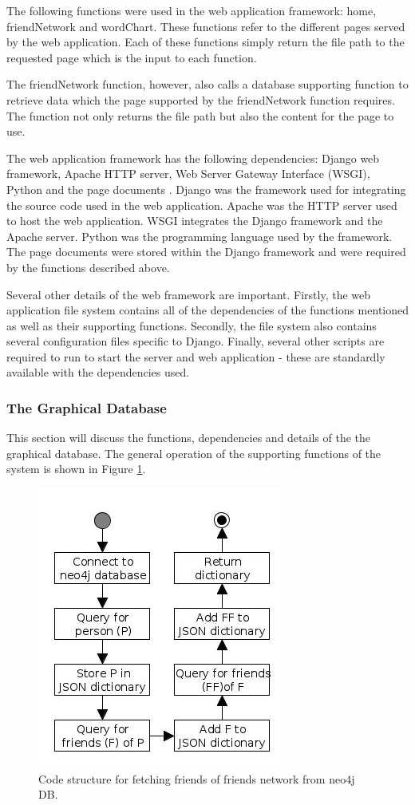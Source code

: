 \documentclass[10pt,onecolumn]{article}
\begin{document}
	The following functions were used in the web application framework: home, friendNetwork and wordChart. These functions refer to the different pages served by the web application. Each of these functions simply return the file path to the requested page which is the input to each function.
	
	The friendNetwork function, however, also calls a database supporting function to retrieve data which the page supported by the friendNetwork function requires. The function not only returns the file path but also the content for the page to use.
	
	The web application framework has the following dependencies: Django web framework, Apache HTTP server, Web Server Gateway Interface (WSGI), Python  and the page documents \cite{django, apache, wsgi}. Django was the framework used for integrating the source code used in the web application. Apache was the HTTP server used to host the web application. WSGI integrates the Django framework and the Apache server. Python was the programming language used by the framework. The page documents were stored within the Django framework and were required by the functions described above. 
	
	Several other details of the web framework are important. Firstly, the web application file system contains all of the dependencies of the functions mentioned as well as their supporting functions. Secondly, the file system also contains several configuration files specific to Django. Finally, several other scripts are required to run to start the server and web application - these are standardly available with the dependencies used.
	
	\subsubsection{The Graphical Database}
	This section will discuss the functions, dependencies and details of the the graphical database. The general operation of the supporting functions of the system is shown in Figure \ref{fig:db}.
	
		\begin{figure} [htb]
			\centering
			\includegraphics[scale=1]{neo4jdb}
			\caption{Code structure for fetching friends of friends network from neo4j DB.} \label{fig:db}
		\end{figure}
\end{document}
